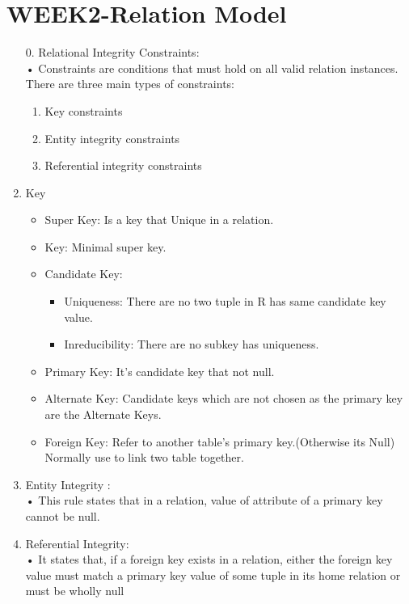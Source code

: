 \pagebreak
\section{WEEK2-Relation Model}
\begin{enumerate}
\item[0.] Relational Integrity Constraints:\\
• Constraints are conditions that must hold on all
valid relation instances. There are three main types
of constraints:
    \begin{enumerate}
        \item Key constraints
        \item Entity integrity constraints
        \item Referential integrity constraints
    \end{enumerate}
    \item Key
    \begin{itemize}
        \item Super Key: Is a key that Unique in a relation.
        \item Key: Minimal super key.
        \item Candidate Key:\begin{itemize}
            \item Uniqueness: There are no two tuple in R has same candidate key value. 
            \item Inreducibility: There are no subkey has uniqueness.
        \end{itemize}
        
        \item Primary Key: It's candidate key that not null.
        \item Alternate Key: Candidate keys which are not chosen as the primary key are the Alternate Keys.
        \item Foreign Key: Refer to another table's primary key.(Otherwise its Null) Normally use to link two table together.
    \end{itemize}
    \item Entity Integrity :\\
• This rule states that in a relation, value of attribute of
a primary key cannot be null.
    \item Referential Integrity:\\
• It states that, if a foreign key exists in a relation,
either the foreign key value must match a primary key
value of some tuple in its home relation or must be
wholly null
\end{enumerate}